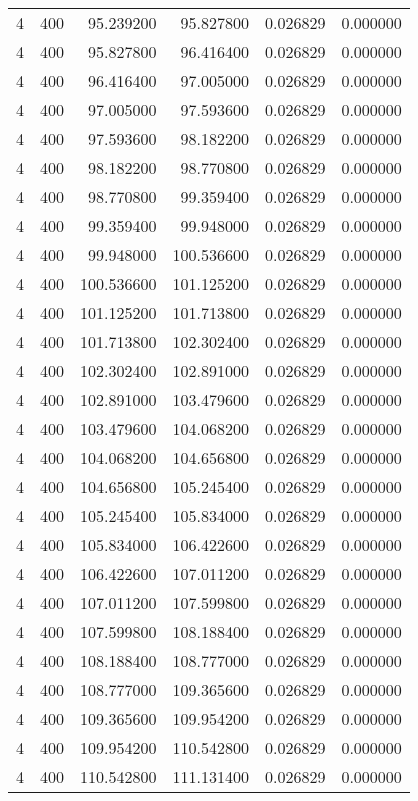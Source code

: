 \begin{longtable}{rrrrrr}
4 & 400 & 95.239200 & 95.827800 & 0.026829 & 0.000000 \\
4 & 400 & 95.827800 & 96.416400 & 0.026829 & 0.000000 \\
4 & 400 & 96.416400 & 97.005000 & 0.026829 & 0.000000 \\
4 & 400 & 97.005000 & 97.593600 & 0.026829 & 0.000000 \\
4 & 400 & 97.593600 & 98.182200 & 0.026829 & 0.000000 \\
4 & 400 & 98.182200 & 98.770800 & 0.026829 & 0.000000 \\
4 & 400 & 98.770800 & 99.359400 & 0.026829 & 0.000000 \\
4 & 400 & 99.359400 & 99.948000 & 0.026829 & 0.000000 \\
4 & 400 & 99.948000 & 100.536600 & 0.026829 & 0.000000 \\
4 & 400 & 100.536600 & 101.125200 & 0.026829 & 0.000000 \\
4 & 400 & 101.125200 & 101.713800 & 0.026829 & 0.000000 \\
4 & 400 & 101.713800 & 102.302400 & 0.026829 & 0.000000 \\
4 & 400 & 102.302400 & 102.891000 & 0.026829 & 0.000000 \\
4 & 400 & 102.891000 & 103.479600 & 0.026829 & 0.000000 \\
4 & 400 & 103.479600 & 104.068200 & 0.026829 & 0.000000 \\
4 & 400 & 104.068200 & 104.656800 & 0.026829 & 0.000000 \\
4 & 400 & 104.656800 & 105.245400 & 0.026829 & 0.000000 \\
4 & 400 & 105.245400 & 105.834000 & 0.026829 & 0.000000 \\
4 & 400 & 105.834000 & 106.422600 & 0.026829 & 0.000000 \\
4 & 400 & 106.422600 & 107.011200 & 0.026829 & 0.000000 \\
4 & 400 & 107.011200 & 107.599800 & 0.026829 & 0.000000 \\
4 & 400 & 107.599800 & 108.188400 & 0.026829 & 0.000000 \\
4 & 400 & 108.188400 & 108.777000 & 0.026829 & 0.000000 \\
4 & 400 & 108.777000 & 109.365600 & 0.026829 & 0.000000 \\
4 & 400 & 109.365600 & 109.954200 & 0.026829 & 0.000000 \\
4 & 400 & 109.954200 & 110.542800 & 0.026829 & 0.000000 \\
4 & 400 & 110.542800 & 111.131400 & 0.026829 & 0.000000 \\

\end{longtable}
